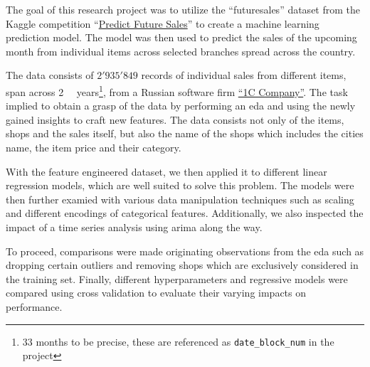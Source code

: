 The goal of this research project was to utilize the \enquote{\gls{futuresales}} dataset from the Kaggle competition \enquote{\href{https://www.kaggle.com/c/competitive-data-science-predict-future-sales}{Predict Future Sales}} to create a machine learning prediction model.
The model was then used to predict the sales of the upcoming month from individual items across selected branches spread across the country.

The data consists of $2'935'849$ records of individual sales from different items, span across \mbox{2 \textonehalf} \ years\footnote{33 months to be precise, these are referenced as \texttt{date\_block\_num} in the project}, from a Russian software firm \href{https://1c.ru/eng/title.htm}{\enquote{1C Company}}.
The task implied to obtain a grasp of the data by performing an \acrfull{eda} and using the newly gained insights to craft new features.
The data consists not only of the items, shops and the sales itself, but also the name of the shops which includes the cities name, the item price and their category.

With the feature engineered dataset, we then applied it to different linear regression models, which are well suited to solve this problem.
The models were then further examied with various data manipulation techniques such as scaling and different encodings of categorical features.
Additionally, we also inspected the impact of a time series analysis using \acrshort{arima} along the way.

To proceed, comparisons were made originating observations from the \acrshort{eda} such as dropping certain outliers and removing shops which are exclusively considered in the training set.
Finally, different \glspl{hyperparameter} and regressive models were compared using cross validation to evaluate their varying impacts on performance.
